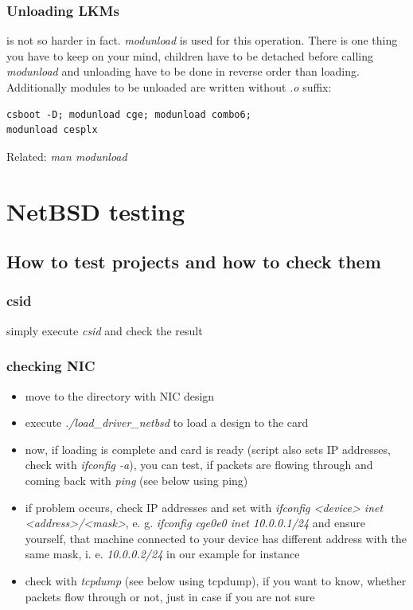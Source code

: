   \subsubsection{Unloading LKMs}
  is not so harder in fact. \emph{modunload} is used for this operation. There
  is one thing you have to keep on your mind, children have to be detached
  before calling \emph{modunload} and unloading have to be done in reverse
  order than loading. Additionally modules to be unloaded are written without
  \emph{.o} suffix:
\begin{verbatim}
csboot -D; modunload cge; modunload combo6;
modunload cesplx
\end{verbatim}
  Related: \emph{man modunload}
  \section{NetBSD testing}
  \subsection{How to test projects and how to check them}
  \subsubsection{csid}
  simply execute \emph{csid} and check the result

  \subsubsection{checking NIC}
  \begin{itemize}
    \item move to the directory with NIC design
    \item execute \emph{./load\_driver\_netbsd} to load a design to the card
    \item now, if loading is complete and card is ready (script also sets IP
      addresses, check with \emph{ifconfig -a}), you can test, if packets are
      flowing through and coming back with \emph{ping} (see below using ping)
    \item if problem occurs, check IP addresses and set with
      \emph{ifconfig <device> inet <address>/<mask>}, e. g. \emph{ifconfig
      cge0e0 inet 10.0.0.1/24} and ensure yourself, that machine connected to
      your device has different address with the same mask, i. e.
      \emph{10.0.0.2/24} in our example for instance
    \item check with \emph{tcpdump} (see below using tcpdump), if you want to
      know, whether packets flow through or not, just in case if you are not
      sure
  \end{itemize}

